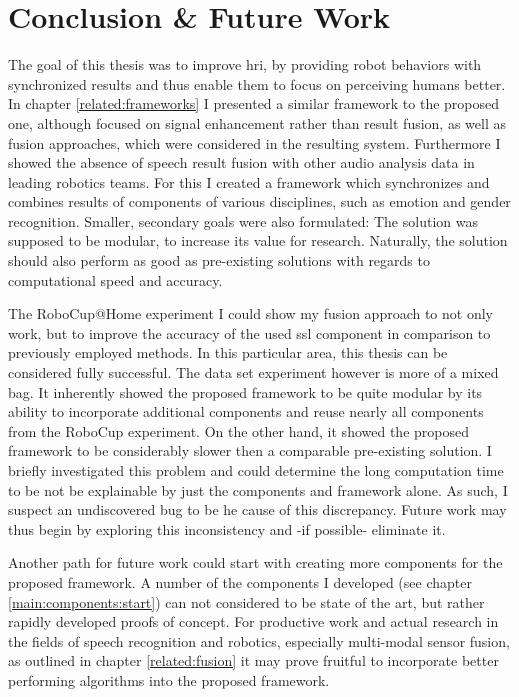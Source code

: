 

\chapter{Conclusion \& Future Work}
\label{conclusion}

The goal of this thesis was to improve \gls{hri}, by providing robot behaviors with synchronized results and thus enable them to focus on perceiving humans better.
In chapter \ref{related:frameworks} I presented a similar framework to the proposed one, although focused on signal enhancement rather than result fusion, as well as fusion approaches, which were considered in the resulting system.
Furthermore I showed the absence of speech result fusion with other audio analysis data in leading robotics teams.
For this I created a framework which synchronizes and combines results of components of various disciplines, such as emotion and gender recognition.
Smaller, secondary goals were also formulated:
The solution was supposed to be modular, to increase its value for research.
Naturally, the solution should also perform as good as pre-existing solutions with regards to computational speed and accuracy.

The RoboCup@Home experiment I could show my fusion approach to not only work, but to improve the accuracy of the used \gls{ssl} component in comparison to previously employed methods.
In this particular area, this thesis can be considered fully successful.
The data set experiment however is more of a mixed bag.
It inherently showed the proposed framework to be quite modular by its ability to incorporate additional components and reuse nearly all components from the RoboCup experiment.
On the other hand, it showed the proposed framework to be considerably slower then a comparable pre-existing solution.
I briefly investigated this problem and could determine the long computation time to be not be explainable by just the components and framework alone.
As such, I suspect an undiscovered bug to be he cause of this discrepancy.
Future work may thus begin by exploring this inconsistency and -if possible- eliminate it.

Another path for future work could start with creating more components for the proposed framework.
A number of the components I developed (see chapter \ref{main:components:start}) can not considered to be state of the art, but rather rapidly developed proofs of concept.
For productive work and actual research in the fields of speech recognition and robotics, especially multi-modal sensor fusion, as outlined in chapter \ref{related:fusion} it may prove fruitful to incorporate better performing algorithms into the proposed framework.

